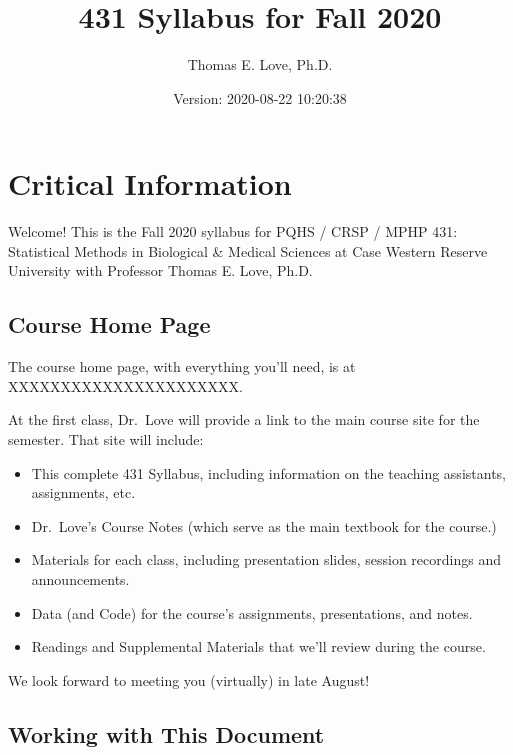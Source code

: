 \documentclass[
]{book}
\title{431 Syllabus for Fall 2020}
\author{Thomas E. Love, Ph.D.}
\date{Version: 2020-08-22 10:20:38}
\providecommand{\tightlist}{%
  \setlength{\itemsep}{0pt}\setlength{\parskip}{0pt}}
\begin{document}
\maketitle

{
\setcounter{tocdepth}{1}
\tableofcontents
}
\hypertarget{critical-information}{%
\chapter*{Critical Information}\label{critical-information}}

Welcome! This is the Fall 2020 syllabus for PQHS / CRSP / MPHP 431: Statistical Methods in Biological \& Medical Sciences at Case Western Reserve University with Professor Thomas E. Love, Ph.D.

\hypertarget{course-home-page}{%
\section*{Course Home Page}\label{course-home-page}}

The course home page, with everything you'll need, is at XXXXXXXXXXXXXXXXXXXXXX.

At the first class, Dr.~Love will provide a link to the main course site for the semester. That site will include:

\begin{itemize}
\tightlist
\item
  This complete 431 Syllabus, including information on the teaching assistants, assignments, etc.
\item
  Dr.~Love's Course Notes (which serve as the main textbook for the course.)
\item
  Materials for each class, including presentation slides, session recordings and announcements.
\item
  Data (and Code) for the course's assignments, presentations, and notes.
\item
  Readings and Supplemental Materials that we'll review during the course.
\end{itemize}

We look forward to meeting you (virtually) in late August!

\hypertarget{working-with-this-document}{%
\section*{Working with This Document}\label{working-with-this-document}}
\end{document}
